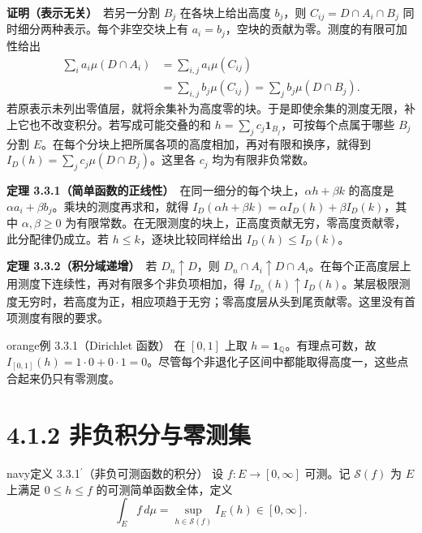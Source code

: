 \documentclass[11pt,a4paper]{article}
\begin{document}
\textbf{证明（表示无关）}　若另一分割 \(B_j\) 在各块上给出高度
\(b_j\)，则 \(C_{ij}=D\cap A_i\cap B_j\)
同时细分两种表示。每个非空交块上有
\(a_i=b_j\)，空块的贡献为零。测度的有限可加性给出 \begin{equation*}
\begin{aligned}
\sum_i a_i\mu(D\cap A_i)
 &=\sum_{i,j}a_i\mu(C_{ij})\\
 &=\sum_{i,j}b_j\mu(C_{ij})
 =\sum_j b_j\mu(D\cap B_j).
\end{aligned}
\end{equation*}
若原表示未列出零值层，就将余集补为高度零的块。于是即使余集的测度无限，补上它也不改变积分。若写成可能交叠的和
\(h=\sum_j c_j\mathbf1_{B_j}\)，可按每个点属于哪些 \(B_j\) 分割
\(E\)。在每个分块上把所属各项的高度相加，再对有限和换序，就得到
\(I_D(h)=\sum_j c_j\mu(D\cap B_j)\)。这里各 \(c_j\) 均为有限非负常数。

\textbf{定理
3.3.1（简单函数的正线性）}　在同一细分的每个块上，\(\alpha h+\beta k\)
的高度是 \(\alpha a_i+\beta b_j\)。乘块的测度再求和，就得
\(I_D(\alpha h+\beta k)=\alpha I_D(h)+\beta I_D(k)\)，其中
\(\alpha,\beta\ge0\)
为有限常数。在无限测度的块上，正高度贡献无穷，零高度贡献零，此分配律仍成立。若
\(h\le k\)，逐块比较同样给出 \(I_D(h)\le I_D(k)\)。

\textbf{定理 3.3.2（积分域递增）}　若 \(D_n\uparrow D\)，则
\(D_n\cap A_i\uparrow D\cap A_i\)。在每个正高度层上用测度下连续性，再对有限多个非负项相加，得
\(I_{D_n}(h)\uparrow I_D(h)\)。某层极限测度无穷时，若高度为正，相应项趋于无穷；零高度层从头到尾贡献零。这里没有首项测度有限的要求。

\begin{sboxenv}{orange}{例 3.3.1（Dirichlet 函数）}
在 \([0,1]\) 上取 \(h=\mathbf1_{\mathbb Q}\)。有理点可数，故
\(I_{[0,1]}(h)=1\cdot0+0\cdot1=0\)。尽管每个非退化子区间中都能取得高度一，这些点合起来仍只有零测度。

\end{sboxenv}

\clearpage\section[\S{}4.1.2
非负积分与零测集]{4.1.2
非负积分与零测集}\label{ux975eux8d1fux79efux5206ux4e0eux96f6ux6d4bux96c6}

\begin{sboxenv}{navy}{定义 3.3.1\ensuremath{{}^{\prime}}（非负可测函数的积分）}
设 \(f:E\to[0,\infty]\) 可测。记 \(\mathcal S(f)\) 为 \(E\) 上满足
\(0\le h\le f\) 的可测简单函数全体，定义 \begin{equation*}
\int_E f\,d\mu=\sup_{h\in\mathcal S(f)} I_E(h)\in[0,\infty].\tag{4.1.1}
\end{equation*}

\end{sboxenv}
\end{document}
